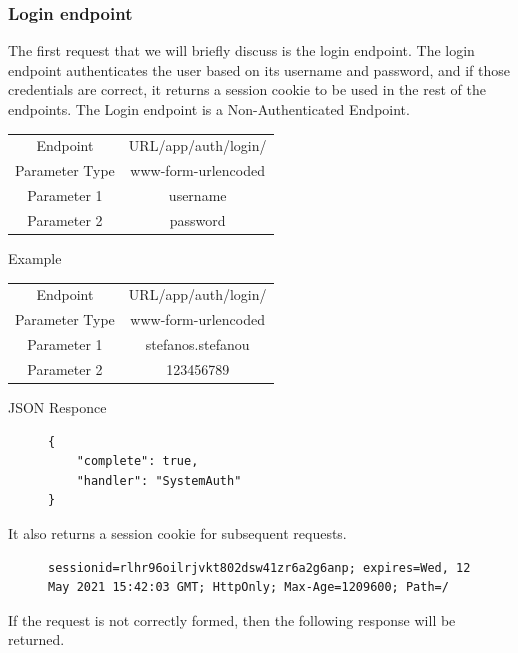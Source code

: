 				\subsubsection{Login endpoint}
					The first request that we will briefly discuss is the login endpoint. The login endpoint authenticates the 
					user based on its username and password, and if those credentials are correct, it returns a session cookie 
					to be used in the rest of the endpoints. The Login endpoint is a Non-Authenticated Endpoint.\par
					\begin{center}
						\begin{tabular}{ |c|c| } 
							\hline
							Endpoint & {{URL}}/app/auth/login/\\
							Parameter Type & www-form-urlencoded  \\
							Parameter 1 & username\\
							Parameter 2 & password  \\
							\hline
						\end{tabular}
					\end{center}
					Example
					\begin{center}
						\begin{tabular}{ |c|c| } 
							\hline
							Endpoint & {{URL}}/app/auth/login/\\
							Parameter Type & www-form-urlencoded  \\
							Parameter 1 & stefanos.stefanou\\
							Parameter 2 & 123456789  \\
							\hline
						\end{tabular}
					\end{center}
					JSON Responce
					\begin{figure}[H]
						\iftrue
						\begin{lstlisting}[]
{
	"complete": true,
	"handler": "SystemAuth"
}
						\end{lstlisting}
					\end{figure}
					It also returns a session cookie for subsequent requests.
					\begin{figure}[H]
					\iftrue
						\begin{lstlisting}[]
sessionid=rlhr96oilrjvkt802dsw41zr6a2g6anp; expires=Wed, 12 May 2021 15:42:03 GMT; HttpOnly; Max-Age=1209600; Path=/
						\end{lstlisting}
					\end{figure}
					If the request is not correctly formed, then the following response will be returned.
